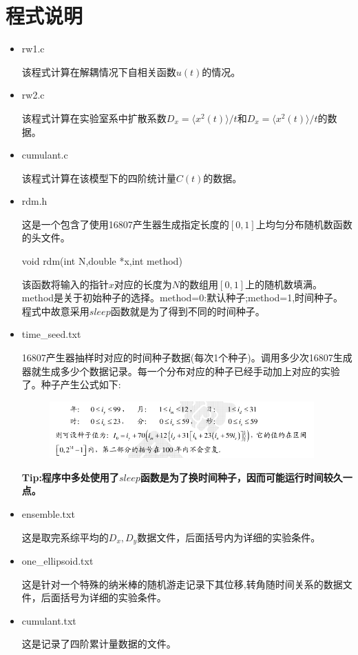 \documentclass[UTF8]{ctexart}
\begin{document}
	\section{程式说明}
	
	
	\begin{itemize}
		\item rw1.c
		
		该程式计算在解耦情况下自相关函数$u(t)$的情况。
		
		\item rw2.c
		
		该程式计算在实验室系中扩散系数$D_x=\langle x^2(t) \rangle/t$和$D_x=\langle x^2(t) \rangle/t$的数据。
		
		\item cumulant.c
		
		该程式计算在该模型下的四阶统计量$C(t)$的数据。
		
		\item rdm.h
			
		这是一个包含了使用16807产生器生成指定长度的$[0,1]$上均匀分布随机数函数的头文件。
		
		\subitem void rdm(int N,double *x,int method)
		
		该函数将输入的指针$x$对应的长度为$N$的数组用$[0,1]$上的随机数填满。method是关于初始种子的选择。method=0:默认种子;method=1,时间种子。程式中故意采用$sleep$函数就是为了得到不同的时间种子。
		
		\item time\_seed.txt
		
		16807产生器抽样时对应的时间种子数据(每次1个种子)。调用多少次16807生成器就生成多少个数据记录。每一个分布对应的种子已经手动加上对应的实验了。种子产生公式如下:
		
		
		\begin{figure}[H]
			\centering  %
			\includegraphics[width=4in]{2}
		\end{figure}
		
\textbf{		Tip:程序中多处使用了$sleep$函数是为了换时间种子，因而可能运行时间较久一点。}
	
		\item ensemble.txt
		
		这是取完系综平均的$D_x,D_y$数据文件，后面括号内为详细的实验条件。
		
		\item one\_ellipsoid.txt
		
		这是针对一个特殊的纳米棒的随机游走记录下其位移,转角随时间关系的数据文件，后面括号为详细的实验条件。
		
		\item cumulant.txt
		
		这是记录了四阶累计量数据的文件。
		
		
	\end{itemize}
	
\end{document}
